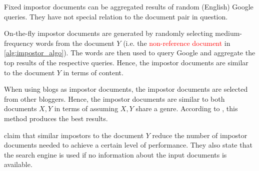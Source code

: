 Fixed impostor documents can be aggregated results of random (English) Google queries.
They have not special relation to the document pair in question.

On-the-fly impostor documents are generated by randomly selecting medium-frequency words from the document $Y$ (i.e. the \textcolor{red}{non-reference document} in \autoref{alg:impostor_algo}).
The words are then used to query Google and aggregate the top results of the respective queries. 
Hence, the impostor documents are similar to the document $Y$ in terms of content.

When using blogs as impostor documents, the impostor documents are selected from other bloggers. 
Hence, the impostor documents are similar to both documents $X,Y$ in terms of assuming $X,Y$ share a genre.
According to \citet{koppel_determining_2014}, this method produces the best results.

\citet{koppel_determining_2014} claim that similar impostors to the document $Y$ reduce the number of impostor documents needed to achieve a certain level of performance.
They also state that the search engine is used if no information about the input documents is available.